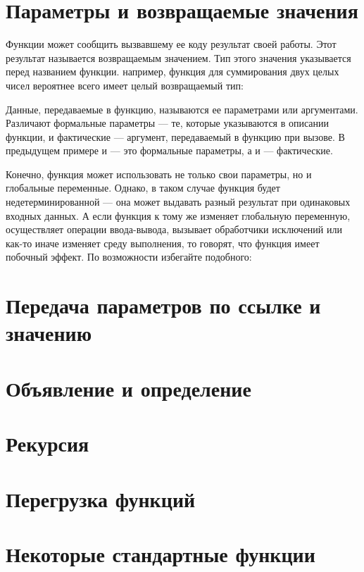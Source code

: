 \documentclass[book.tex]{subfiles}
\begin{document}
\section*{Параметры и возвращаемые значения}

Функции может сообщить вызвавшему ее коду результат своей работы. Этот результат называется возвращаемым значением. Тип этого значения указывается перед названием функции. например, функция для суммирования двух целых чисел вероятнее всего имеет целый возвращаемый тип:


Данные, передаваемые в функцию, называются ее параметрами или аргументами. Различают формальные параметры --- те, которые указываются в описании функции, и фактические --- аргумент, передаваемый в функцию при вызове. В предыдущем примере  и  --- это формальные параметры, а  и  --- фактические.

Конечно, функция может использовать не только свои параметры, но и глобальные переменные. Однако, в таком случае функция будет недетерминированной --- она может выдавать разный результат при одинаковых входных данных. А если функция к тому же изменяет глобальную переменную, осуществляет операции ввода-вывода, вызывает обработчики исключений или как-то иначе изменяет среду выполнения, то говорят, что функция имеет побочный эффект.  По возможности избегайте подобного:


\section*{Передача параметров по ссылке и значению}

\section*{Объявление и определение}

\section*{Рекурсия}

\section*{Перегрузка функций}

\section*{Некоторые стандартные функции}
\end{document}
